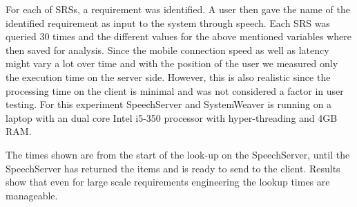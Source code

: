 \documentclass[conference]{IEEEtran}
\begin{document}



For each of SRSs, a requirement was identified. A user then gave the name of the identified requirement as input to the system through speech. 
Each SRS was queried 30 times and the different values for the above mentioned variables where then saved for analysis.
Since the mobile connection speed as well as latency might vary a lot over time and with the position of the user we measured only the execution time on the server side.
However, this is also realistic since the processing time on the client is minimal and was not considered a factor in user testing.
For this experiment SpeechServer and SystemWeaver is running on a laptop with an dual core Intel i5-350 processor with hyper-threading and 4GB RAM.

The times shown are from the start of the look-up on the SpeechServer, until the SpeechServer has returned the items and is ready to send to the client. 
Results show that even for large scale requirements engineering the lookup times are manageable. 
\end{document}
